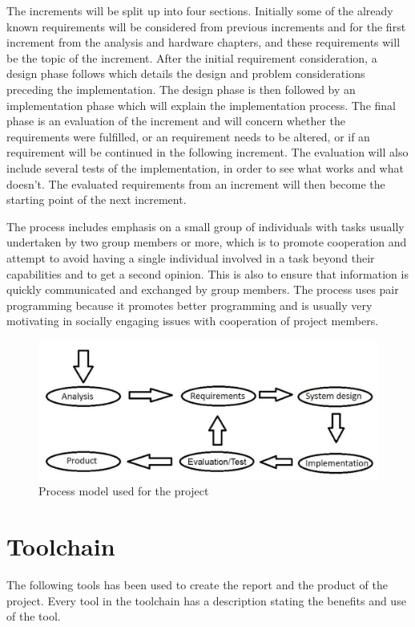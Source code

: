 The increments will be split up into four sections. Initially some of the already known requirements will be considered from previous increments and for the first increment from the analysis and hardware chapters, and these requirements will be the topic of the increment.
After the initial requirement consideration, a design phase follows which details the design and problem considerations preceding the implementation. The design phase is then followed by an implementation phase which will explain the implementation process. The final phase is an evaluation of the increment and will concern whether the requirements were fulfilled, or an requirement needs to be altered, or if an requirement will be continued in the following increment. The evaluation will also include several tests of the implementation, in order to see what works and what doesn't. The evaluated requirements from an increment will then become the starting point of the next increment. 

The process includes emphasis on a small group of individuals with tasks usually undertaken by two group members or more, which is to promote cooperation and attempt to avoid having a single individual involved in a task beyond their capabilities and to get a second opinion. This is also to ensure that information is quickly communicated and exchanged by group members. The process uses pair programming because it promotes better programming and is usually very motivating in socially engaging issues with cooperation of project members.

\begin{figure}[h]
\centering
\includegraphics[scale=0.30]{billeder/process-model}
\caption{Process model used for the project}
\label{pm}
\end{figure}

\chapter*{Toolchain}
The following tools has been used to create the report and the product of the project. Every tool in the toolchain has a description stating the benefits and use of the tool.

